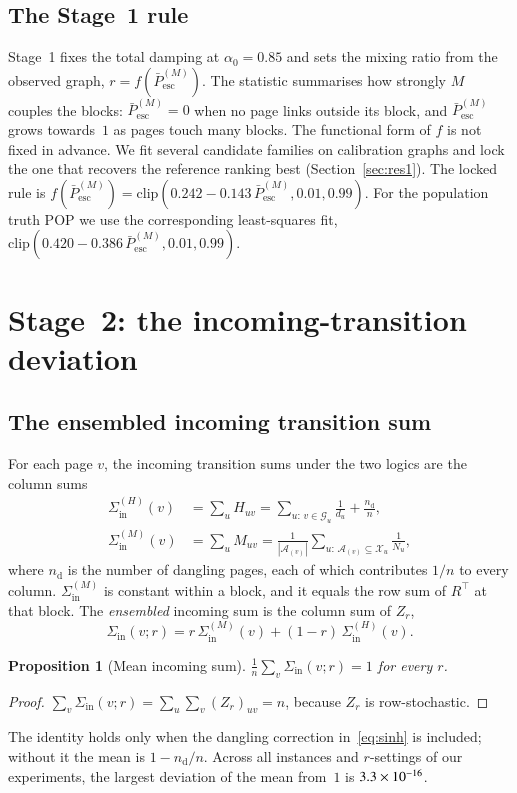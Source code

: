 \documentclass[11pt,a4paper]{article}
\newtheorem{proposition}{Proposition}
\theoremstyle{definition}
\theoremstyle{remark}
\newcommand{\Pbar}{\bar P^{(M)}_{\mathrm{esc}}}
\newcommand{\Sin}{\Sigma_{\mathrm{in}}}
\newcommand{\clip}{\mathrm{clip}}
\begin{document}
\subsection{The Stage~1 rule}
Stage~1 fixes the total damping at $\alpha_0=0.85$ and sets the mixing ratio from the observed graph,
$r=f(\Pbar)$. The statistic summarises how strongly $M$ couples the blocks: $\Pbar=0$ when no page links
outside its block, and $\Pbar$ grows towards~$1$ as pages touch many blocks. The functional form of $f$
is not fixed in advance. We fit several candidate families on calibration graphs and lock the one that
recovers the reference ranking best (Section~\ref{sec:res1}). The locked rule is
$f(\Pbar)=\clip(0.242-0.143\,\Pbar,0.01,0.99)$. For the population truth POP we use the corresponding
least-squares fit, $\clip(0.420-0.386\,\Pbar,0.01,0.99)$.

\section{Stage~2: the incoming-transition deviation}
\label{sec:stage2}

\subsection{The ensembled incoming transition sum}
For each page $v$, the incoming transition sums under the two logics are the column sums
\begin{align}
\Sin^{(H)}(v)&=\sum_{u}H_{uv}=\sum_{u:\,v\in\mathcal G_u}\frac{1}{d_u}+\frac{n_{\mathrm d}}{n},
\label{eq:sinh}\\
\Sin^{(M)}(v)&=\sum_u M_{uv}=\frac{1}{|\mathcal A_{(v)}|}\sum_{u:\,\mathcal A_{(v)}\subseteq\mathcal X_u}\frac{1}{N_u},
\label{eq:sinm}
\end{align}
where $n_{\mathrm d}$ is the number of dangling pages, each of which contributes $1/n$ to every column.
$\Sin^{(M)}$ is constant within a block, and it equals the row sum of $R^\top$ at that block. The
\emph{ensembled} incoming sum is the column sum of $Z_r$,
\begin{equation}
\Sin(v;r)=r\,\Sin^{(M)}(v)+(1-r)\,\Sin^{(H)}(v).
\label{eq:sin}
\end{equation}

\begin{proposition}[Mean incoming sum]\label{prop:mean}
$\frac1n\sum_v\Sin(v;r)=1$ for every $r$.
\end{proposition}
\begin{proof}
$\sum_v\Sin(v;r)=\sum_u\sum_v(Z_r)_{uv}=n$, because $Z_r$ is row-stochastic.
\end{proof}
\noindent
The identity holds only when the dangling correction in~\eqref{eq:sinh} is included; without it the mean
is $1-n_{\mathrm d}/n$. Across all instances and $r$-settings of our experiments, the largest deviation
of the mean from~$1$ is $3.3\times10^{-16}$.
\end{document}
